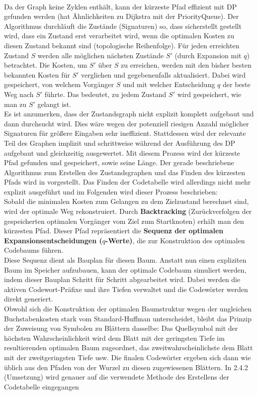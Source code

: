 \documentclass[a4paper,10pt,ngerman]{scrartcl}
\begin{document}
\\
\newline
Da der Graph keine Zyklen enthält, kann der kürzeste Pfad effizient mit DP gefunden werden (hat Ähnlichkeiten zu Dijkstra mit der PriorityQueue). Der Algorithmus durchläuft die Zustände (Signaturen) so, dass sicherstellt gestellt wird, dass ein Zustand erst verarbeitet wird, wenn die optimalen Kosten zu diesen Zustand bekannt sind (topologische Reihenfolge). Für jeden erreichten Zustand $S$ werden alle möglichen nächsten Zustände $S'$ (durch Expansion mit $q$) betrachtet. Die Kosten, um $S'$ über $S$ zu erreichen, werden mit den bisher besten bekannten Kosten für $S'$ verglichen und gegebenenfalls aktualisiert. Dabei wird gespeichert, von welchem Vorgänger $S$ und mit welcher Entscheidung $q$ der beste Weg nach $S'$ führte. Das bedeutet, zu jedem Zustand $S'$ wird gespeichert, wie man zu $S'$ gelangt ist.  
\\
Es ist anzumerken, dass der Zustandsgraph nicht explizit komplett aufgebaut und dann durchsucht wird. Dies wäre wegen der potenziell riesigen Anzahl möglicher Signaturen für größere Eingaben sehr ineffizient. Stattdessen wird der relevante Teil des Graphen implizit und schrittweise während der Ausführung des DP aufgebaut und gleichzeitig ausgewertet. Mit diesem Prozess wird der kürzeste Pfad gefunden und gespeichert, sowie seine Länge. Der gerade beschriebene Algorithmus zum Erstellen des Zustandsgraphen und das Finden des kürzesten Pfads wird in \cite{papergolinrote} vorgestellt. Das Finden der Codetabelle wird allerdings nicht mehr explizit ausgeführt und im Folgenden wird dieser Prozess beschrieben:
\\\newline
Sobald die minimalen Kosten zum Gelangen zu dem Zielzustand berechnet sind, wird der optimale Weg rekonstruiert. Durch \textbf{Backtracking} (Zurückverfolgen der gespeicherten optimalen Vorgänger vom Ziel zum Startknoten) erhält man den kürzesten Pfad. Dieser Pfad repräsentiert die \textbf{Sequenz der optimalen Expansionsentscheidungen ($q$-Werte)}, die zur Konstruktion des optimalen Codebaums führen.
\\
Diese Sequenz dient als Bauplan für diesen Baum. Anstatt nun einen expliziten Baum im Speicher aufzubauen, kann der optimale Codebaum simuliert werden, indem dieser Bauplan Schritt für Schritt abgearbeitet wird. Dabei werden die aktiven Codewort-Präfixe und ihre Tiefen verwaltet und die Codewörter werden direkt generiert.
\\
Obwohl sich die Konstruktion der optimalen Baumstruktur wegen der ungleichen Buchstabenkosten stark vom Standard-Huffman unterscheidet, bleibt das Prinzip der Zuweisung von Symbolen zu Blättern dasselbe: Das Quellsymbol mit der höchsten Wahrscheinlichkeit wird dem Blatt mit der geringsten Tiefe im resultierenden optimalen Baum zugeordnet, das zweitwahrscheinlichste dem Blatt mit der zweitgeringsten Tiefe usw. Die finalen Codewörter ergeben sich dann wie üblich aus den Pfaden von der Wurzel zu diesen zugewiesenen Blättern. In 2.4.2 (Umsetzung) wird genauer auf die verwendete Methode des Erstellens der Codetabelle eingegangen
\end{document}
